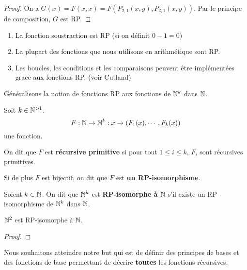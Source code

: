 \ifdefined\outputproof
\begin{proof}
	On a $G(x) = F(x, x) = F(P_{2, 1}(x, y), P_{2, 1}(x, y))$. Par le principe
	de composition, $G$ est RP.
\end{proof}
\fi

\begin{exemple}
	\begin{enumerate}
		\item La fonction soustraction est RP (si on définit $0 - 1 = 0$)
		\item La plupart des fonctions que nous utilisons en arithmétique sont
			RP.
		\item Les boucles, les conditions et les comparaisons peuvent être
			implémentées grace aux fonctions RP. (voir Cutland)
	\end{enumerate}
\end{exemple}

Généralisons la notion de fonctions RP aux fonctions de $\mathbb{N}^{k}$ dans
$\mathbb{N}$.

\begin{definition} 
	Soit $k \in \mathbb{N}^{> 1}$.
	\begin{equation}
		F : \mathbb{N} \rightarrow \mathbb{N}^{k} : x \rightarrow (F_{1}(x), \cdots,
		F_{k}(x))
	\end{equation}
	une fonction.

	On dit que $F$ est \textbf{récursive primitive} si pour tout $1 \leq i \leq
	k$, $F_{i}$ sont récursives primitives.

	Si de plus $F$ est bijectif, on dit que $F$ est \textbf{un RP-isomorphisme}.
\end{definition}

\begin{definition} [RP isomorphe]
	Soient $k \in \mathbb{N}$. On dit que $\mathbb{N}^{k}$ est \textbf{RP-isomorphe à
	$\mathbb{N}$} s'il existe un RP-isomorphisme de $\mathbb{N}^{k}$ dans $\mathbb{N}$.
\end{definition}

\begin{proposition}
	$\mathbb{N}^{2}$ est RP-isomorphe à $\mathbb{N}$.
\end{proposition}

\ifdefined\outputproof
\begin{proof}
\end{proof}
\fi

Nous souhaitons atteindre notre but qui est de définir des principes de bases et des
fonctions de base permettant de décrire \textbf{toutes} les fonctions
récursives.

